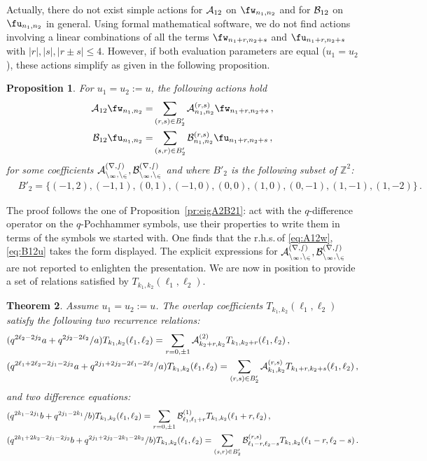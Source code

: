 \documentclass[11pt]{amsart}
\numberwithin{equation}{section}
\newtheorem{thm}{Theorem}[section]
\newtheorem{prop}[thm]{Proposition}
\numberwithin{equation}{section}
\begin{document}
 Actually, there do not exist simple actions for ${\cal A}_{12}$ on $\fw_{n_1,n_2}$ and for ${\cal B}_{12}$ on $\fu_{n_1,n_2}$ in general. Using formal mathematical software, we do not find actions involving a linear combinations of all the terms $\fw_{n_1+r,n_2+s}$ and $\fu_{n_1+r,n_2+s}$ with $|r|,|s|,|r\pm s|\leq 4$. However, if both evaluation parameters are equal ($u_1=u_2$), these actions simplify as given in the following proposition.
\begin{prop}\label{pr:A12B12}
 For $u_1=u_2:=u$, the following actions hold
    \begin{align}
 \label{eq:A12w}       {\cal A}_{12}\fw_{n_1,n_2}=&\sum_{(r,s)\in B_2'}{\cal A}^{(r,s)}_{n_1,n_2}\fw_{n_1+r,n_2+s}\,,\\
 \label{eq:B12u}       {\cal B}_{12}   \fu_{n_1,n_2}=&\sum_{(s,r)\in B_2'}{\cal B}^{(r,s)}_{n_1,n_2}\fu_{n_1+r,n_2+s}\,,
    \end{align}
   for some coefficients $\cal A_{n_1,n_2}^{(r,s)},\cal B_{n_1,n_2}^{(r,s)}$  and where $B'_2$ is the following subset of $\mathbb{Z}^2$:
\begin{align} \label{eq:AB2}
 &B'_2=\{(-1,2),(-1,1),(0,1), (-1,0),(0,0), (1,0),  (0,-1), (1,-1), (1,-2)\}\,.
 \end{align}
\end{prop}
\proof The proof follows the one of Proposition~\ref{pr:eigA2B21}: act with the $q$-difference operator on the $q$-Pochhammer symbols, use their properties to write them in terms of the symbols we started with. One finds that the r.h.s.\,of \eqref{eq:A12w}, \eqref{eq:B12u} takes the form displayed.  The explicit expressions for $\cal A_{n_1,n_2}^{(r,s)},\cal B_{n_1,n_2}^{(r,s)}$ are not reported to enlighten the presentation.  \endproof
We are now in position to provide a set of relations satisfied by $T_{k_1,k_2}(\ell_1,\ell_2)$.
\begin{thm}\label{th:recu2}
    Assume $u_1=u_2:=u$. The overlap coefficients $T_{k_1,k_2}(\ell_1,\ell_2)$ satisfy the following two recurrence relations:
\begin{align}
 &   (q^{2\ell_2-2j_2}a+q^{2j_2-2\ell_2}/a)T_{k_1,k_2}(\ell_1,\ell_2)=\sum_{r=0,\pm 1}
    {\cal A}^{(2)}_{k_2+r,k_2} T_{k_1,k_2+r}(\ell_1,\ell_2)\,,\label{eq:rec1T}\\
  &  (q^{2\ell_1+2\ell_2-2j_1-2j_2}a+q^{2j_1+2j_2-2\ell_1-2\ell_2}/a)T_{k_1,k_2}(\ell_1,\ell_2)=\sum_{(r,s)\in B_2'}{\cal A}^{(r,s)}_{k_1,k_2}T_{k_1+r,k_2+s}(\ell_1,\ell_2)\,,\label{eq:rec2T}
\end{align}
and two difference equations:
\begin{align}
&  (q^{2k_1-2j_1}b+q^{2j_1-2k_1}/b) T_{k_1,k_2}(\ell_1,\ell_2)=\sum_{r=0,\pm 1}{\cal B}^{(1)}_{\ell_1,\ell_1+r}T_{k_1,k_2}(\ell_1+r,\ell_2)\,,\\
 \label{eq:diff2}  &(q^{2k_1+2k_2-2j_1-2j_2}b+q^{2j_1+2j_2-2k_1-2k_2}/b)T_{k_1,k_2}(\ell_1,\ell_2)=\sum_{(s,r)\in B_2'}{\cal B}^{(r,s)}_{\ell_1-r,\ell_2-s}T_{k_1,k_2}(\ell_1-r,\ell_2-s) \,.
\end{align}
\end{thm}
\end{document}
